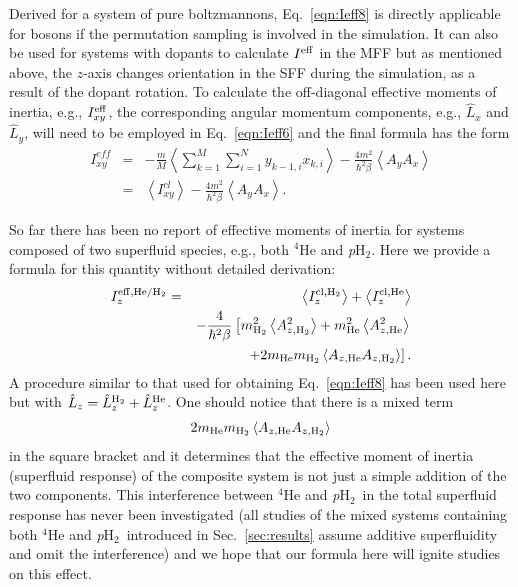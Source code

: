 \documentclass[12pt]{iopart}
\newcommand{\phtwo}{{\em p}H$_2$}
\begin{document}
Derived for a system of pure boltzmannons, Eq.~\ref{eqn:Ieff8} is directly applicable for bosons if the permutation sampling is involved in the simulation. It can also be used for systems with dopants to calculate $I^{\rm eff}$ in the MFF but as mentioned above, the $z$-axis changes orientation in the SFF during the simulation, as a result of the dopant rotation. To calculate the off-diagonal effective moments of inertia, e.g., $I^{\rm eff}_{xy}$, the corresponding angular momentum components, e.g., ${\hat{L}_x}$ and ${\hat{L}_y}$, will need to be employed in Eq.~\ref{eqn:Ieff6} and the final formula has the form 
\begin{eqnarray}
I^{eff}_{xy} &= &-\frac{m}{M}\left< \sum_{k=1}^M \sum_{i=1}^N y_{k-1,i}x_{k,i} \right> - \frac{4m^2}{\hbar^2\beta}\left< A_y A_x \right> \\
&=& \left< I^{cl}_{xy} \right> - \frac{4m^2}{\hbar^2\beta}\left< A_y A_x \right>.
\end{eqnarray}

So far there has been no report of effective moments of inertia for  systems composed of two superfluid species, e.g., both $^4$He and \phtwo. Here we provide a formula for this quantity without detailed derivation:
\begin{eqnarray}
I^{\rm eff, He/H_2}_z&=&\left<I^{\rm cl,H_2}_z \right>+\left<I^{\rm cl,He}_z \right>\nonumber \\
&&-\frac{4}{\hbar^2\beta}\left[ m_{\rm H_2}^2\left< A_{z,{\rm H_2}}^2 \right>+m_{\rm He}^2\left< A_{z,{\rm He}}^2 \right>\right.\nonumber\\
&&\left.+2m_{\rm He}m_{\rm H_2}\left< A_{z,{\rm He}}A_{z,{\rm H_2}} \right> \right].
\end{eqnarray}
A procedure similar to that used for obtaining Eq.~\ref{eqn:Ieff8} has been used here but with $\hat{L}_z=\hat{L}_z^{\rm H_2}+\hat{L}_z^{\rm He}$. One should notice that there is a mixed term
\begin{eqnarray}
2m_{\rm He}m_{\rm H_2}\left< A_{z,{\rm He}}A_{z,{\rm H_2}} \right> 
\end{eqnarray}
in the square bracket and it determines that the effective moment of inertia (superfluid response) of the composite system is not just a simple addition of the two components. 
This interference between $^4$He and \phtwo~in the total superfluid response has never been investigated 
(all studies of the mixed systems containing both $^4$He and \phtwo~introduced in Sec.~\ref{sec:results} assume additive superfluidity and omit the interference)
and we hope that our formula here will ignite studies on this effect.
\end{document}
